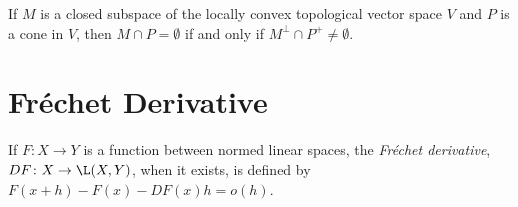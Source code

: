 \begin{corollary}
If $M$ is a closed subspace of the locally convex topological vector space $V$ and
$P$ is a cone in $V$,  then  $M\cap P=\emptyset$ if and only if $M^\perp\cap P^+\not=\emptyset$.
\end{corollary}

\section{Fr\'echet Derivative}
If $F\colon X\to Y$ is a function between normed linear spaces, 
the {\em Fr\'echet derivative}, $DF\colon X\to\L(X,Y)$, when it exists,
is defined by $F(x + h) - F(x) - DF(x)h = o(h)$.